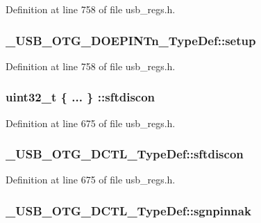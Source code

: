 Definition at line 758 of file usb\-\_\-regs.\-h.

\hypertarget{group___u_s_b___o_t_g___d_r_i_v_e_r_ga1fcadb3c98fdf26e6e29a2ee7611ee01}{
\subsubsection[{setup}]{ \-\_\-\-U\-S\-B\-\_\-\-O\-T\-G\-\_\-\-D\-O\-E\-P\-I\-N\-Tn\-\_\-\-Type\-Def\-::setup}}\label{group___u_s_b___o_t_g___d_r_i_v_e_r_ga1fcadb3c98fdf26e6e29a2ee7611ee01}


Definition at line 758 of file usb\-\_\-regs.\-h.

\hypertarget{group___u_s_b___o_t_g___d_r_i_v_e_r_ga5242f2968a4b72ca53c4a8525bda460c}{
\subsubsection[{sftdiscon}]{\setlength{\rightskip}{0pt plus 5cm}uint32\-\_\-t \{ ... \} \-::sftdiscon}}\label{group___u_s_b___o_t_g___d_r_i_v_e_r_ga5242f2968a4b72ca53c4a8525bda460c}


Definition at line 675 of file usb\-\_\-regs.\-h.

\hypertarget{group___u_s_b___o_t_g___d_r_i_v_e_r_gaf94e6c012ba368a29ac9e69ea7f44f73}{
\subsubsection[{sftdiscon}]{ \-\_\-\-U\-S\-B\-\_\-\-O\-T\-G\-\_\-\-D\-C\-T\-L\-\_\-\-Type\-Def\-::sftdiscon}}\label{group___u_s_b___o_t_g___d_r_i_v_e_r_gaf94e6c012ba368a29ac9e69ea7f44f73}


Definition at line 675 of file usb\-\_\-regs.\-h.

\hypertarget{group___u_s_b___o_t_g___d_r_i_v_e_r_ga444b8daf71ae36bb5d68b2d837f436f0}{
\subsubsection[{sgnpinnak}]{ \-\_\-\-U\-S\-B\-\_\-\-O\-T\-G\-\_\-\-D\-C\-T\-L\-\_\-\-Type\-Def\-::sgnpinnak}}\label{group___u_s_b___o_t_g___d_r_i_v_e_r_ga444b8daf71ae36bb5d68b2d837f436f0}



